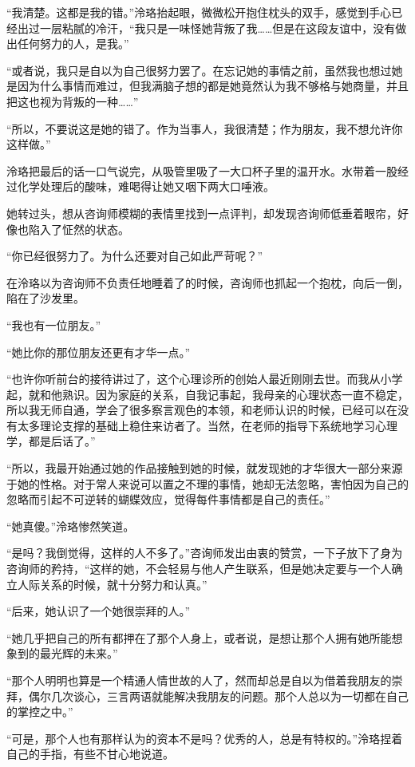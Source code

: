\documentclass[UTF8, scheme = chinese, openany]{ctexbook}
\begin{document}
“我清楚。这都是我的错。”泠珞抬起眼，微微松开抱住枕头的双手，感觉到手心已经出过一层粘腻的冷汗，“我只是一味怪她背叛了我……但是在这段友谊中，没有做出任何努力的人，是我。”

“或者说，我只是自以为自己很努力罢了。在忘记她的事情之前，虽然我也想过她是因为什么事情而难过，但我满脑子想的都是她竟然认为我不够格与她商量，并且把这也视为背叛的一种……”

“所以，不要说这是她的错了。作为当事人，我很清楚；作为朋友，我不想允许你这样做。”

泠珞把最后的话一口气说完，从吸管里吸了一大口杯子里的温开水。水带着一股经过化学处理后的酸味，难喝得让她又咽下两大口唾液。

她转过头，想从咨询师模糊的表情里找到一点评判，却发现咨询师低垂着眼帘，好像也陷入了怔然的状态。

“你已经很努力了。为什么还要对自己如此严苛呢？”

在泠珞以为咨询师不负责任地睡着了的时候，咨询师也抓起一个抱枕，向后一倒，陷在了沙发里。

“我也有一位朋友。”

“她比你的那位朋友还更有才华一点。”

“也许你听前台的接待讲过了，这个心理诊所的创始人最近刚刚去世。而我从小学起，就和他熟识。因为家庭的关系，自我记事起，我母亲的心理状态一直不稳定，所以我无师自通，学会了很多察言观色的本领，和老师认识的时候，已经可以在没有太多理论支撑的基础上稳住来访者了。当然，在老师的指导下系统地学习心理学，都是后话了。”

“所以，我最开始通过她的作品接触到她的时候，就发现她的才华很大一部分来源于她的性格。对于常人来说可以置之不理的事情，她却无法忽略，害怕因为自己的忽略而引起不可逆转的蝴蝶效应，觉得每件事情都是自己的责任。”

“她真傻。”泠珞惨然笑道。

“是吗？我倒觉得，这样的人不多了。”咨询师发出由衷的赞赏，一下子放下了身为咨询师的矜持，“这样的她，不会轻易与他人产生联系，但是她决定要与一个人确立人际关系的时候，就十分努力和认真。”

“后来，她认识了一个她很崇拜的人。”

“她几乎把自己的所有都押在了那个人身上，或者说，是想让那个人拥有她所能想象到的最光辉的未来。”

“那个人明明也算是一个精通人情世故的人了，然而却总是自以为借着我朋友的崇拜，偶尔几次谈心，三言两语就能解决我朋友的问题。那个人总以为一切都在自己的掌控之中。”

“可是，那个人也有那样认为的资本不是吗？优秀的人，总是有特权的。”泠珞捏着自己的手指，有些不甘心地说道。
\end{document}
